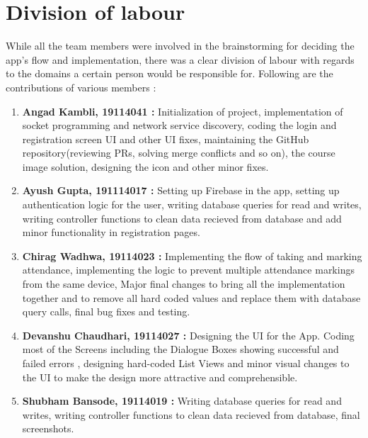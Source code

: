 \documentclass{article}
\begin{document}
\section{Division of labour}
While all the team members were involved in the brainstorming for deciding the app's flow and implementation, there was a clear division of labour with regards to the domains a certain person would be responsible for. Following are the contributions of various members :
\begin{enumerate}
    \item \textbf{Angad Kambli, 19114041 :} Initialization of project, implementation of socket programming and network service discovery, coding the login and registration screen UI and other UI fixes, maintaining the GitHub repository(reviewing PRs, solving merge conflicts and so on), the course image solution, designing the icon and other minor fixes.
    \item \textbf{Ayush Gupta, 191114017 : } Setting up Firebase in the app, setting up authentication logic for the user, writing database queries for read and writes, writing controller functions to clean data recieved from database and add minor functionality in registration pages.
    \item \textbf{Chirag Wadhwa, 19114023 : } Implementing the flow of taking and marking attendance, implementing the logic to prevent multiple attendance markings from the same device, Major final changes to bring all the implementation together and to remove all hard coded values and replace them with database query calls, final bug fixes and testing.
    \item \textbf{Devanshu Chaudhari, 19114027 : } Designing the UI for the App. Coding most of the Screens including the Dialogue Boxes showing successful and failed errors , designing hard-coded List Views and minor visual changes to the UI to make the design more attractive and comprehensible.
    \item \textbf{Shubham Bansode, 19114019 : }  Writing database queries for read and writes, writing controller functions to clean data recieved from database, final screenshots.
\end{enumerate}
\end{document}
